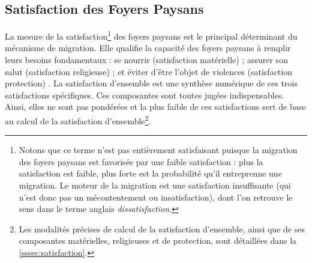 
\subsection{Satisfaction des Foyers Paysans}

La mesure de la satisfaction\footnote{
	Notons que ce terme n'est pas entièrement \og satisfaisant\fg{} puisque la migration des foyers paysans est favorisée par une faible satisfaction : plus la satisfaction est faible, plus forte est la probabilité qu'il entreprenne une migration.
	Le moteur de la migration est une satisfaction insuffisante (qui n'est donc pas un mécontentement ou \og insatisfaction\fg{}), dont l'on retrouve le sens dans le terme anglais \textit{dissatisfaction}.
} des foyers paysans est le principal déterminant du mécanisme de migration.
Elle qualifie la capacité des foyers paysans à remplir leurs besoins fondamentaux : \og se nourrir\fg{} (satisfaction matérielle) ; \og assurer son salut\fg{} (satisfaction religieuse) ; et \og éviter d'être l'objet de violences\fg{} (satisfaction \og protection\fg{}) \autocite[Tableau 1, \ppno~309]{cura_transition_2017}.
La satisfaction d'ensemble est une synthèse numérique de ces trois satisfactions spécifiques.
Ces composantes sont toutes jugées indispensables.
Ainsi, elles ne sont pas pondérées et la plus faible de ces satisfactions sert de base au calcul de la satisfaction d'ensemble\footnote{
	Les modalités précises de calcul de la satisfaction d'ensemble, ainsi que de ses composantes matérielles, religieuses et de protection, sont détaillées dans la \cref{sssec:satisfaction}.
}.
%

